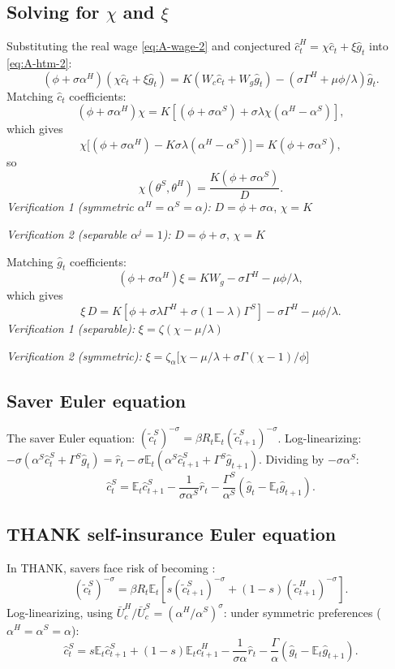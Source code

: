 \subsection{Solving for $\chi$ and $\xi$}\label{app:chi-xi}
Substituting the real wage \eqref{eq:A-wage-2} and conjectured
$\hat c^{H}_{t}=\chi\hat c_{t}+\xi\hat g_{t}$ into \eqref{eq:A-htm-2}:
\[
  (\phi+\sigma\alpha^{H})(\chi\hat c_{t}+\xi\hat g_{t})=K(W_{c}\hat c_{t}+W_{g}\hat g_{t})-(\sigma\Gamma^{H}+\mu\phi/\lambda)\hat g_{t}.
\]
Matching $\hat c_{t}$ coefficients:
\[
  (\phi+\sigma\alpha^{H})\chi=K[(\phi+\sigma\alpha^{S})+\sigma\lambda\chi(\alpha^{H}-\alpha^{S})],
\]
which gives
\[
  \chi\bigl[(\phi+\sigma\alpha^{H})-K\sigma\lambda(\alpha^{H}-\alpha^{S})\bigr]=K(\phi+\sigma\alpha^{S}),
\]
so
\[
  \chi(\theta^{S},\theta^{H})=\frac{K(\phi+\sigma\alpha^{S})}{D}.
\]
\emph{Verification 1 (symmetric $\alpha^{H}=\alpha^{S}=\alpha$):}
$D=\phi+\sigma\alpha$, $\chi=K$

\emph{Verification 2 (separable $\alpha^{j}=1$):} $D=\phi+\sigma$, $\chi=K$

Matching $\hat g_{t}$ coefficients:
\[
  (\phi+\sigma\alpha^{H})\xi=KW_{g}-\sigma\Gamma^{H}-\mu\phi/\lambda,
\]
which gives
\[
  \xi\,D=K[\phi+\sigma\lambda\Gamma^{H}+\sigma(1-\lambda)\Gamma^{S}]-\sigma\Gamma^{H}-\mu\phi/\lambda.
\]
\emph{Verification 1 (separable):} $\xi=\zeta(\chi-\mu/\lambda)$

\emph{Verification 2 (symmetric):} $\xi=\zeta_{\alpha}\bigl[\chi-\mu/\lambda+\sigma\Gamma(\chi-1)/\phi\bigr]$

\subsection{Saver Euler equation}\label{app:saver-euler}
The saver Euler equation: $(\tilde c^{S}_{t})^{-\sigma}=\beta R_{t}\mathbb{E}_{t}(\tilde c^{S}_{t+1})^{-\sigma}$.
Log-linearizing: $-\sigma(\alpha^{S}\hat c^{S}_{t}+\Gamma^{S}\hat g_{t})=\hat r_{t}-\sigma\mathbb{E}_{t}(\alpha^{S}\hat c^{S}_{t+1}+\Gamma^{S}\hat g_{t+1})$.
Dividing by $-\sigma\alpha^{S}$:
\[
  \hat c^{S}_{t}=\mathbb{E}_{t}\hat c^{S}_{t+1}-\frac{1}{\sigma\alpha^{S}}\hat r_{t}
    -\frac{\Gamma^{S}}{\alpha^{S}}(\hat g_{t}-\mathbb{E}_{t}\hat g_{t+1}).
\]

\subsection{THANK self-insurance Euler equation}\label{app:self-insurance}
In THANK, savers face risk of becoming \HtM:
\begin{equation}\label{eq:A-insurance}
  (\tilde c^{S}_{t})^{-\sigma}=\beta R_{t}\mathbb{E}_{t}[s(\tilde c^{S}_{t+1})^{-\sigma}+(1-s)(\tilde c^{H}_{t+1})^{-\sigma}].
\end{equation}
Log-linearizing, using $\bar U^{H}_{c}/\bar U^{S}_{c}=(\alpha^{H}/\alpha^{S})^{\sigma}$:
under symmetric preferences ($\alpha^{H}=\alpha^{S}=\alpha$):
\[
  \hat c^{S}_{t}=s\mathbb{E}_{t}\hat c^{S}_{t+1}+(1-s)\mathbb{E}_{t}\hat c^{H}_{t+1}-\frac{1}{\sigma\alpha}\hat r_{t}-\frac{\Gamma}{\alpha}(\hat g_{t}-\mathbb{E}_{t}\hat g_{t+1}).
\]

